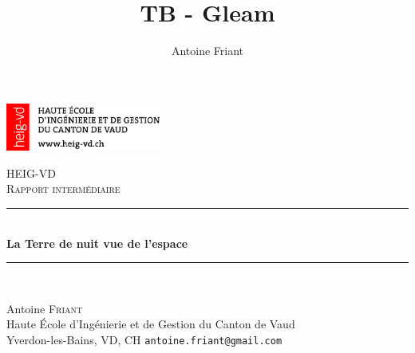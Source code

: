 \documentclass[a4paper, 11pt]{report}
\title{TB - Gleam}
\author{Antoine Friant}
\begin{document}
\begin{titlepage}

\newcommand{\HRule}{\rule{\linewidth}{0.5mm}} %

\includegraphics[width=2in]{img/logoheig.png}\\ %

\vspace{1in}

\center %
 

\textsc{\LARGE HEIG-VD}\\[1.5cm] %
\textsc{\Large Rapport intermédiaire}\\[0.5cm] %


\HRule \\[0.4cm]
{ \huge \bfseries La Terre de nuit vue de l'espace }\\ %
\Large\HRule \\[2cm]
\normalsize

\begin{minipage}[t]{0.48\textwidth}
\begin{flushleft} \large
Antoine \textsc{Friant} \\
\normalsize
Haute École d'Ingénierie et de Gestion du Canton de Vaud\\
Yverdon-les-Bains, VD, CH
\texttt{antoine.friant@gmail.com}
\end{flushleft}
\end{minipage}
~
\begin{minipage}[t]{0.49\textwidth}
\begin{flushright} \large
\end{flushright}
\end{minipage}\\[2cm]




\end{titlepage}
\end{document}
